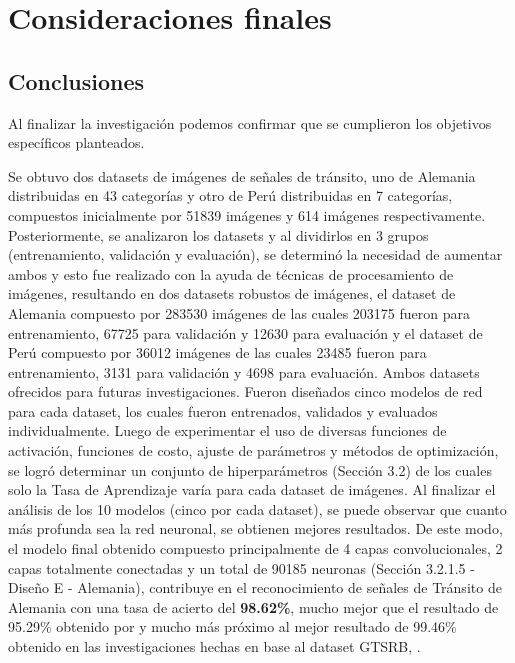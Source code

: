 \chapter{Consideraciones finales}
\setcounter{page}{128}
\renewcommand{\baselinestretch}{2} %
\textheight 21cm

\section{Conclusiones}

	Al finalizar la investigación podemos confirmar que se cumplieron los objetivos específicos planteados.

	Se obtuvo dos datasets de imágenes de señales de tránsito, uno de Alemania distribuidas en 43 categorías y otro de Perú distribuidas en 7 categorías, compuestos inicialmente por 51839 imágenes y 614 imágenes respectivamente.
\vskip 0.2cm
	Posteriormente, se analizaron los datasets y al dividirlos en 3 grupos (entrenamiento, validación y evaluación), se determinó la necesidad de aumentar ambos y esto fue realizado con la ayuda de técnicas de procesamiento de imágenes, resultando en dos datasets robustos de imágenes, el dataset de Alemania compuesto por 283530 imágenes de las cuales 203175 fueron para entrenamiento, 67725 para validación y 12630 para evaluación y el dataset de Perú compuesto por 36012 imágenes de las cuales 23485 fueron para entrenamiento, 3131 para validación y 4698 para evaluación. Ambos datasets ofrecidos para futuras investigaciones.
\vskip 0.2cm
	Fueron diseñados cinco modelos de red para cada dataset, los cuales fueron entrenados, validados y evaluados individualmente.
\vskip 0.2cm
	Luego de experimentar el uso de diversas funciones de activación, funciones de costo, ajuste de parámetros y métodos de optimización, se logró determinar un conjunto de hiperparámetros (Sección 3.2) de los cuales solo la Tasa de Aprendizaje varía para cada dataset de imágenes. 
	\vskip 0.2cm
	Al finalizar el análisis de los 10 modelos (cinco por cada dataset), se puede observar que cuanto más profunda sea la red neuronal, se obtienen mejores resultados. 
\vskip 0.2cm
	De este modo, el modelo final obtenido compuesto principalmente de 4 capas convolucionales, 2 capas totalmente conectadas y un total de 90185 neuronas (Sección 3.2.1.5 - Diseño E - Alemania), contribuye en el reconocimiento de señales de Tránsito de Alemania con una tasa de acierto del {\bf 98.62\%}, mucho mejor que el resultado de 95.29\% obtenido por \citep{Ayuque2016} y mucho más próximo al mejor resultado de 99.46\% obtenido en las investigaciones hechas en base al dataset GTSRB, \citep{Ciresan}.
	\vskip 0.2cm
	
